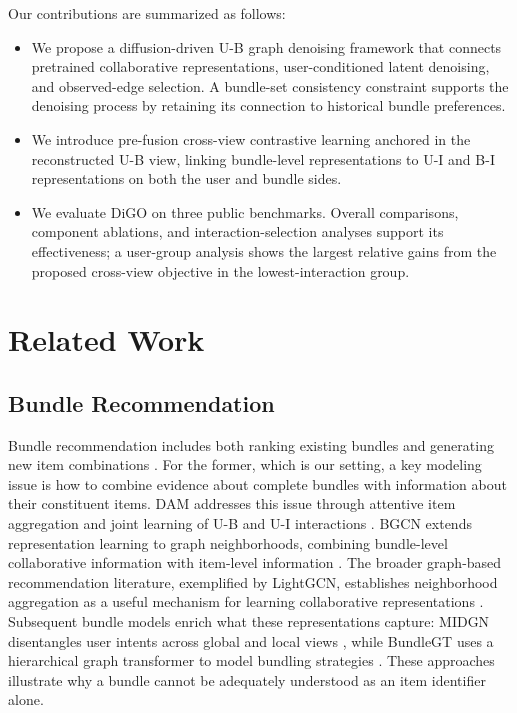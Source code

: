 Our contributions are summarized as follows:

\begin{itemize}
\item We propose a diffusion-driven U-B graph denoising framework that connects pretrained collaborative representations, user-conditioned latent denoising, and observed-edge selection. A bundle-set consistency constraint supports the denoising process by retaining its connection to historical bundle preferences.
\item We introduce pre-fusion cross-view contrastive learning anchored in the reconstructed U-B view, linking bundle-level representations to U-I and B-I representations on both the user and bundle sides.
\item We evaluate DiGO on three public benchmarks. Overall comparisons, component ablations, and interaction-selection analyses support its effectiveness; a user-group analysis shows the largest relative gains from the proposed cross-view objective in the lowest-interaction group.
\end{itemize}

\section{Related Work}

\subsection{Bundle Recommendation}

Bundle recommendation includes both ranking existing bundles and generating new item combinations \cite{sun2024survey}. For the former, which is our setting, a key modeling issue is how to combine evidence about complete bundles with information about their constituent items. DAM addresses this issue through attentive item aggregation and joint learning of U-B and U-I interactions \cite{chen2019dam}. BGCN extends representation learning to graph neighborhoods, combining bundle-level collaborative information with item-level information \cite{chang2020bgcn}. The broader graph-based recommendation literature, exemplified by LightGCN, establishes neighborhood aggregation as a useful mechanism for learning collaborative representations \cite{he2020lightgcn}. Subsequent bundle models enrich what these representations capture: MIDGN disentangles user intents across global and local views \cite{zhao2022midgn}, while BundleGT uses a hierarchical graph transformer to model bundling strategies \cite{wei2023bundlegt}. These approaches illustrate why a bundle cannot be adequately understood as an item identifier alone.


